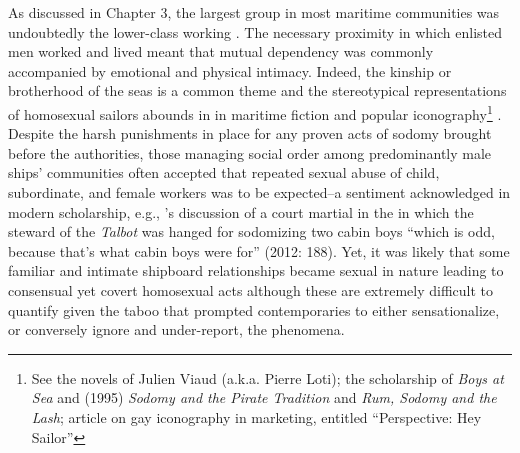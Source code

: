 As discussed in Chapter 3, the largest group in most maritime communities was undoubtedly the lower-class working . The necessary proximity in which enlisted men worked and lived meant that mutual dependency was commonly accompanied by emotional and physical intimacy. Indeed, the kinship or brotherhood of the seas is a common theme and the stereotypical representations of homosexual sailors abounds in in maritime fiction and popular iconography\footnote{See the novels of Julien Viaud (a.k.a. Pierre Loti); the scholarship of  \textit{Boys at Sea} and (1995) \textit{Sodomy and the Pirate Tradition} and  \textit{Rum, Sodomy and the Lash};  article on gay iconography in marketing, entitled “Perspective: Hey Sailor”} . Despite the harsh punishments in place for any proven acts of sodomy brought before the authorities, those managing social order among predominantly male ships’ communities often accepted that repeated sexual abuse of child, subordinate, and female workers was to be expected--a sentiment acknowledged in modern scholarship, e.g., \citeauthor{Bicheno2012}’s discussion of a court martial in the  in which the steward of the \textit{Talbot} was hanged for sodomizing two cabin boys “which is odd, because that’s what cabin boys were for” (2012: 188). Yet, it was likely that some familiar and intimate shipboard relationships became sexual in nature leading to consensual yet covert homosexual acts although these are extremely difficult to quantify given the taboo that prompted contemporaries to either sensationalize, or conversely ignore and under-report, the phenomena. 

